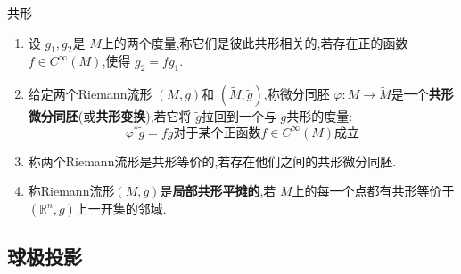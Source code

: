 \documentclass[../../几何与拓扑.tex]{subfiles}
\begin{document}
\begin{definition}{共形}
   \begin{enumerate}
    \item  设 \(  g_1,g_2  \)是 \(  M  \)上的两个度量,称它们是彼此共形相关的,若存在正的函数 \(  f \in C^{\infty}\left( M \right)   \),使得 \(  g_2= fg_1  \).
    \item 给定两个Riemann流形 \(  \left( M,g \right)   \)和 \(  \left( \tilde{M},\tilde{g} \right)   \),称微分同胚 \(   \varphi :M\to \tilde{M}  \)是一个\textbf{共形微分同胚}(或\textbf{共形变换}),若它将 \(  \tilde{g}  \)拉回到一个与 \(  g  \)共形的度量: \[
     \varphi ^{*}\tilde{g}= fg \text{对于某个正函数} f\in C^{\infty}\left( M \right)\text{成立} 
    \]     
    \item 称两个Riemann流形是共形等价的,若存在他们之间的共形微分同胚.
    \item 称Riemann流形\( \left( M,g \right)   \)是\textbf{局部共形平摊的},若 \(  M  \)上的每一个点都有共形等价于 \(  \left( \mathbb{R} ^{n},\bar{g} \right)   \)上一开集的邻域.   
   \end{enumerate}
       
\end{definition}

\subsection{球极投影}
\end{document}
